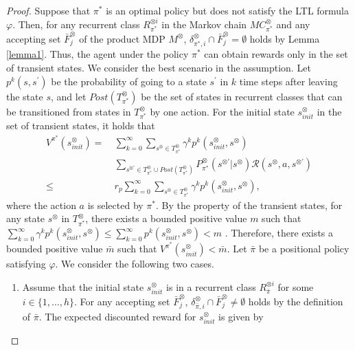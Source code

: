 \documentclass[letterpaper, 10 pt, conference]{ieeeconf}  %
\begin{document}
\begin{proof}
  Suppose that $\pi^{\ast}$ is an optimal policy but does not satisfy the LTL formula $\varphi$. Then, for any recurrent class $R^{\otimes i}_{{\pi}^{\ast}}$ in the Markov chain $MC^{\otimes}_{{\pi}^{\ast}}$ and any accepting set $\bar{F}^{\otimes}_j$ of the product MDP $M^{\otimes}$,  $\delta^{\otimes}_{\pi^{\ast},i} \cap \bar{F}^{\otimes}_j = \emptyset$
  holds by Lemma \ref{lemma1}. Thus, the agent under the policy $\pi^{\ast}$ can obtain rewards only in the set of transient states. We consider the best scenario in the assumption. Let $p^k(s,s^{\prime})$ be the probability of going to a state $s^{\prime}$ in $k$ time steps after leaving the state $s$, and let $Post(T^{\otimes}_{\pi^{\ast}})$ be the set of states in recurrent classes that can be transitioned from states in $T^{\otimes}_{\pi^{\ast}}$ by one action. For the initial state $s^{\otimes}_{init}$ in the set of transient states, it holds that
  \begin{align}
    V^{\pi^{\ast}}\!(s^{\otimes}_{init})
     =\ & \sum_{k=0}^{\infty} \sum_{s^{\otimes} \in T^{\otimes}_{\pi^{\ast}}} \gamma^k p^k(s^{\otimes}_{init}, s^{\otimes}) \nonumber \\
      & \sum_{s^{\otimes \prime} \in T^{\otimes}_{\pi^{\ast}} \cup Post(T^{\otimes}_{\pi^{\ast}})} \!\!\!\!P^{\otimes}_{\pi^{\ast}}(s^{\otimes \prime}| s^{\otimes}) \mathcal{R}(s^{\otimes}, a, s^{\otimes \prime})\nonumber \\
     \leq\ & r_p \sum_{k=0}^{\infty} \sum_{s^{\otimes} \in T^{\otimes}_{\pi^{\ast}}} \gamma^k p^k(s^{\otimes}_{init}, s^{\otimes}), \nonumber
  \label{eqth11}
  \end{align}
  where the action $a$ is selected by $\pi^{\ast}$. By the property of the transient states, for any state $s^{\otimes}$ in $T^{\otimes}_{\pi^{\ast}}$, there exists a bounded positive value $m$ such that $ \sum_{k=0}^{\infty} \gamma^k p^k(s^{\otimes}_{init}, s^{\otimes}) \leq \sum_{k=0}^{\infty} p^k(s^{\otimes}_{init}, s^{\otimes}) < m$ \cite{ESS}. Therefore, there exists a bounded positive value $\bar{m}$ such that $V^{\pi^{\ast}}(s^{\otimes}_{init}) < \bar{m}$.
  Let $\bar{\pi}$ be a positional policy satisfying $\varphi$. We consider the following two cases.
  \begin{enumerate}
    \vspace{2mm}
    \item Assume that the initial state $s^{\otimes}_{init}$ is in a recurrent class $R^{\otimes i}_{\bar{\pi}}$ for some $ i \in \{1,\ldots,h\} $.
    For any accepting set $\bar{F}^{\otimes}_j$, $\delta^{\otimes}_{\bar{\pi},i} \cap \bar{F}^{\otimes}_j \neq \emptyset$ holds by the definition of $\bar{\pi}$. The expected discounted reward for $s^{\otimes}_{init}$ is given by

\end{enumerate}
\end{proof}
\end{document}
